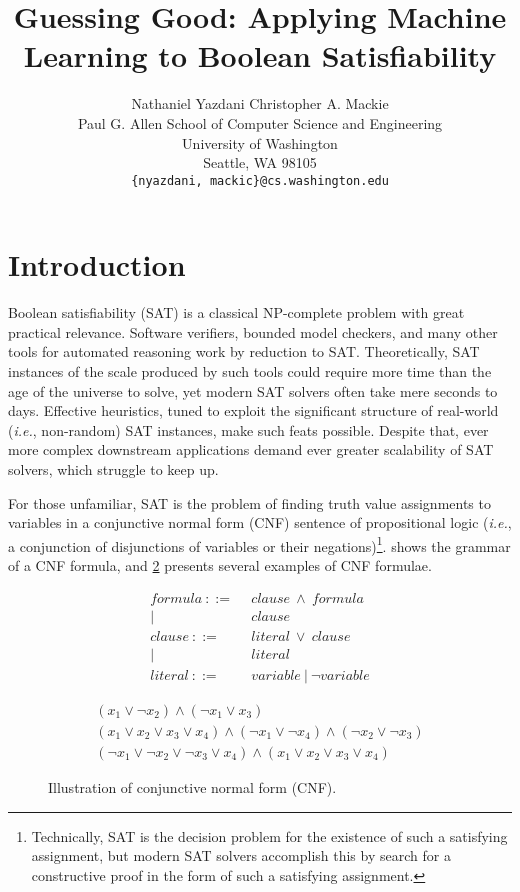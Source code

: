 \documentclass{article}
\title{Guessing Good: Applying Machine Learning to Boolean Satisfiability}
\author{
    Nathaniel Yazdani \quad Christopher A. Mackie\\
    Paul G. Allen School of Computer Science and Engineering\\
    University of Washington\\
    Seattle, WA 98105\\
    \texttt{\{nyazdani, mackic\}@cs.washington.edu}\\
}
\begin{document}
\maketitle

\section*{Introduction}

Boolean satisfiability (SAT) is a classical NP-complete problem with great
practical relevance. Software verifiers, bounded model checkers, and many other
tools for automated reasoning work by reduction to SAT. Theoretically, SAT
instances of the scale produced by such tools could require more time than the
age of the universe to solve, yet modern SAT solvers often take mere seconds to
days. Effective heuristics, tuned to exploit the significant structure of
real-world (\textit{i.e.}, non-random) SAT instances, make such feats possible.
Despite that, ever more complex downstream applications demand ever greater
scalability of SAT solvers, which struggle to keep up.

For those unfamiliar, SAT is the problem of finding truth value assignments to
variables in a conjunctive normal form (CNF) sentence of propositional logic
(\textit{i.e.}, a conjunction of disjunctions of variables or their
negations)\footnote{Technically, SAT is the decision problem for the existence
of such a satisfying assignment, but modern SAT solvers accomplish this by
search for a constructive proof in the form of such a satisfying assignment.}.
 shows the grammar of a CNF formula, and
\cref{fig:cnf-examples} presents several examples of CNF formulae.

\begin{figure}[h]
\centering
\begin{subfigure}{0.4\textwidth}
  \centering
  \begin{align*}
  formula\ ::=&\ \ clause\ \wedge\ formula \\
           |&\ \ clause \\
  clause\ ::=&\ \ literal\ \vee\ clause \\
          |&\ \ literal \\
  literal\ ::=&\ \ variable\ |\ \neg variable
  \end{align*}
  \label{fig:cnf-grammar}
\end{subfigure}%
\begin{subfigure}{0.6\textwidth}
  \centering
  \begin{gather}
  (x_1 \vee \neg x_2) \wedge (\neg x_1 \vee x_3) \\
  (x_1 \vee x_2 \vee x_3 \vee x_4) \wedge (\neg x_1 \vee \neg x_4) \wedge (\neg x_2 \vee \neg x_3) \\
  (\neg x_1 \vee \neg x_2 \vee \neg x_3 \vee x_4) \wedge (x_1 \vee x_2 \vee x_3 \vee x_4)
  \end{gather}
  \label{fig:cnf-examples}
\end{subfigure}%
\caption{Illustration of conjunctive normal form (CNF).}
\label{fig:cnf}
\end{figure}
\end{document}
